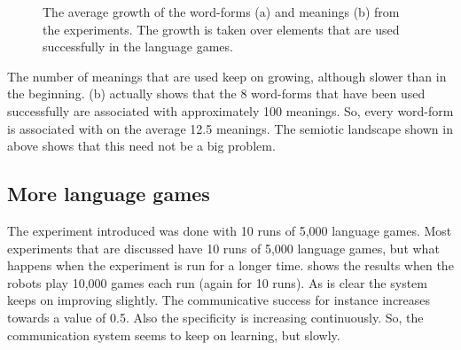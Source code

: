 \begin{figure}
	\centering
	\caption{The average growth of the word-forms (a) and meanings (b) from the experiments. The growth is taken over elements that are used successfully in the language games.}
	\label{f:st:growthlex}
\end{figure}

\newpage The number of meanings that are used keep on growing, although slower than in the beginning.  (b) actually shows that the 8 word-forms that have been used successfully are associated with approximately 100 meanings. So, every word-form is associated with on the average 12.5 meanings. The semiotic landscape shown in above shows that this need not be a big problem.

\subsection{More language games}\label{s:st:10000}

The experiment introduced was done with 10 runs of 5,000 language games. Most experiments that are discussed have 10 runs of 5,000 language games, but what happens when the experiment is run for a longer time.  shows the results when the robots play 10,000 games each run (again for 10 runs). As is clear the system keeps on improving slightly. The communicative success for instance increases towards a value of 0.5. Also the specificity is increasing continuously. So, the communication system seems to keep on learning, but slowly.

